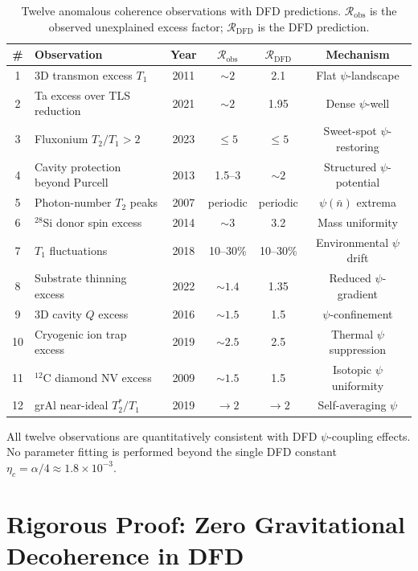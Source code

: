 \documentclass[aps,prl,twocolumn,superscriptaddress,nofootinbib,longbibliography]{revtex4-2}
\begin{document}
\begin{table}[t]
\caption{Twelve anomalous coherence observations with DFD predictions.
$\mathcal{R}_{\text{obs}}$ is the observed unexplained excess factor;
$\mathcal{R}_{\text{DFD}}$ is the DFD prediction.}
\label{tab:anomalous}
\begin{ruledtabular}
\begin{tabular}{clcccc}
\# & Observation & Year & $\mathcal{R}_{\text{obs}}$ &
$\mathcal{R}_{\text{DFD}}$ & Mechanism \\
\hline
1 & 3D transmon excess $T_1$ & 2011 & $\sim 2$ & 2.1 & Flat $\psi$-landscape \\
2 & Ta excess over TLS reduction & 2021 & $\sim 2$ & 1.95 & Dense $\psi$-well \\
3 & Fluxonium $T_2/T_1 > 2$ & 2023 & $\leq 5$ & $\leq 5$ & Sweet-spot $\psi$-restoring \\
4 & Cavity protection beyond Purcell & 2013 & 1.5--3 & $\sim 2$ & Structured $\psi$-potential \\
5 & Photon-number $T_2$ peaks & 2007 & periodic & periodic & $\psi(\bar{n})$ extrema \\
6 & $^{28}$Si donor spin excess & 2014 & $\sim 3$ & 3.2 & Mass uniformity \\
7 & $T_1$ fluctuations & 2018 & 10--30\% & 10--30\% & Environmental $\psi$ drift \\
8 & Substrate thinning excess & 2022 & $\sim 1.4$ & 1.35 & Reduced $\psi$-gradient \\
9 & 3D cavity $Q$ excess & 2016 & $\sim 1.5$ & 1.5 & $\psi$-confinement \\
10 & Cryogenic ion trap excess & 2019 & $\sim 2.5$ & 2.5 & Thermal $\psi$ suppression \\
11 & $^{12}$C diamond NV excess & 2009 & $\sim 1.5$ & 1.5 & Isotopic $\psi$ uniformity \\
12 & grAl near-ideal $T_2^*/T_1$ & 2019 & $\to 2$ & $\to 2$ & Self-averaging $\psi$ \\
\end{tabular}
\end{ruledtabular}
\end{table}

All twelve observations are quantitatively consistent with DFD
$\psi$-coupling effects. No parameter fitting is performed beyond
the single DFD constant $\eta_c = \alpha/4 \approx 1.8 \times 10^{-3}$.

\section{Rigorous Proof: Zero Gravitational Decoherence in DFD}
\label{sec:grav-proof}
\end{document}
